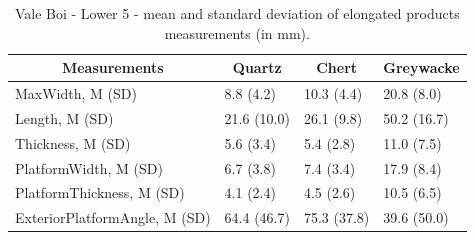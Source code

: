 \documentclass[12pt,twoside]{reedthesis}
\begin{document}
\newpage
\begin{table}[!h]

\caption{\label{tab:elongmetricsVB1}Vale Boi - Lower 5 - mean and standard deviation of elongated products measurements (in mm).}
\centering
\fontsize{9}{11}\selectfont
\begin{tabular}[t]{llll}
\toprule
\multicolumn{1}{c}{\textbf{Measurements}} & \multicolumn{1}{c}{\textbf{Quartz}} & \multicolumn{1}{c}{\textbf{Chert}} & \multicolumn{1}{c}{\textbf{Greywacke}}\\
\midrule
MaxWidth, M (SD) & 8.8 (4.2) & 10.3 (4.4) & 20.8 (8.0)\\
Length, M (SD) & 21.6 (10.0) & 26.1 (9.8) & 50.2 (16.7)\\
Thickness, M (SD) & 5.6 (3.4) & 5.4 (2.8) & 11.0 (7.5)\\
PlatformWidth, M (SD) & 6.7 (3.8) & 7.4 (3.4) & 17.9 (8.4)\\
PlatformThickness, M (SD) & 4.1 (2.4) & 4.5 (2.6) & 10.5 (6.5)\\
\addlinespace
ExteriorPlatformAngle, M (SD) & 64.4 (46.7) & 75.3 (37.8) & 39.6 (50.0)\\
\bottomrule
\end{tabular}
\end{table}
\begin{table}[!h]

\caption{\label{tab:elongmtericsVB2}Vale Boi - Upper 5/4E - mean and standard deviation of elongated products measurements (in mm).}
\centering
{}
\end{table}
\end{document}
